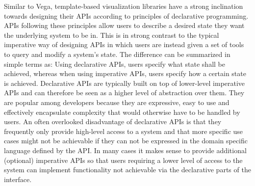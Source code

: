 Similar to Vega, template-based visualization libraries have a strong inclination towards designing their APIs according to principles of declarative programming. APIs following these principles allow users to describe a desired state they want the underlying system to be in. This is in strong contrast to the typical imperative way of designing APIs in which users are instead given a set of tools to query and modify a system's state. The difference can be summarized in simple terms as: Using declarative APIs, users specify what state shall be achieved, whereas when using imperative APIs, users specify how a certain state is achieved. Declarative APIs are typically built on top of lower-level imperative APIs and can therefore be seen as a higher level of abstraction over them. They are popular among developers because they are expressive, easy to use and effectively encapsulate complexity that would otherwise have to be handled by users. An often overlooked disadvantage of declarative APIs is that they frequently only provide high-level access to a system and that more specific use cases might not be achievable if they can not be expressed in the domain specific language defined by the API. In many cases it makes sense to provide additional (optional) imperative APIs so that users requiring a lower level of access to the system can implement functionality not achievable via the declarative parts of the interface.

